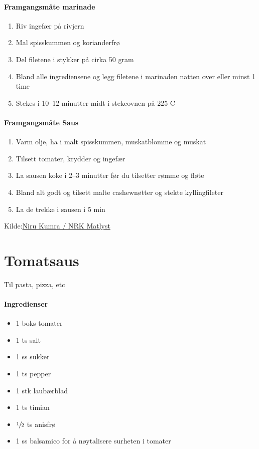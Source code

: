 \documentclass[12pt,a4paper]{book}
\begin{document}
\paragraph{Framgangsmåte marinade}
\begin{enumerate}[noitemsep]
	\item Riv ingefær på rivjern 
	\item Mal spisskummen og korianderfrø
	\item Del filetene i stykker på cirka 50 gram
	\item Bland alle ingrediensene og legg filetene i marinaden natten over eller minst 1 time
	\item Stekes i 10--12 minutter midt i stekeovnen på 225 \degree C
\end{enumerate}

\paragraph{Framgangsmåte Saus}
\begin{enumerate}[noitemsep]
	\item Varm olje, ha i malt spisskummen, muskatblomme og muskat
	\item Tilsett tomater, krydder og ingefær
	\item La sausen koke i 2--3 minutter før du tilsetter rømme og fløte
	\item Bland alt godt og tilsett malte cashewnøtter og stekte kyllingfileter
	\item La de trekke i sausen i 5 min
\end{enumerate}


Kilde:\href{https://www.nrk.no/mat/nirus-chicken-tikka-masala-1.7314334}{Niru Kumra / NRK Matlyst}
\clearpage{}
\clearpage{}\section{﻿Tomatsaus}
Til pasta, pizza, etc

\paragraph{Ingredienser}
\begin{itemize}[noitemsep]
	\item 1 boks tomater
	\item 1 ts salt
	\item 1 ss sukker
	\item 1 ts pepper
	\item 1 stk laubærblad
	\item 1 ts timian
	\item $\sfrac{1}{2}$ ts anisfrø
	\item 1 ss balsamico for å nøytalisere surheten i tomater
\end{itemize}
\end{document}
